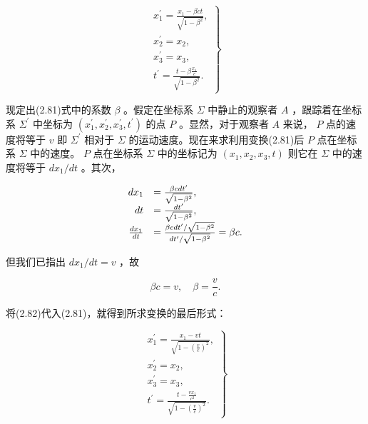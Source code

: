 \begin{equation*}
\left. \begin{array}{l} x _ {1} ^ {\prime} = \frac {x _ {1} - \beta c t}{\sqrt {1 - \beta^ {2}}}, \\ x _ {2} ^ {\prime} = x _ {2}, \\ x _ {3} ^ {\prime} = x _ {3}, \\ t ^ {\prime} = \frac {t - \beta \frac {x _ {1}}{c}}{\sqrt {1 - \beta^ {2}}}. \end{array} \right\}\tag{2.81}
\end{equation*}

现定出(2.81)式中的系数 $\beta$ 。假定在坐标系 $\Sigma$ 中静止的观察者 $A$ ，跟踪着在坐标系 $\Sigma^{\prime}$ 中坐标为 $(x_{1}^{\prime}, x_{2}^{\prime}, x_{3}^{\prime}, t^{\prime})$ 的点 $P$ 。显然，对于观察者 $A$ 来说， $P$ 点的速度将等于 $v$ 即 $\Sigma^{\prime}$ 相对于 $\Sigma$ 的运动速度。现在来求利用变换(2.81)后 $P$ 点在坐标系 $\Sigma$ 中的速度。 $P$ 点在坐标系 $\Sigma$ 中的坐标记为 $(x_{1}, x_{2}, x_{3}, t)$ 则它在 $\Sigma$ 中的速度将等于 $dx_{1}/dt$ 。其次，

\begin{equation*}
\begin{array}{r l} d x _ {1} & = \frac {\beta c d t ^ {\prime}}{\sqrt {1 - \beta^ {2}}}, \\ d t & = \frac {d t ^ {\prime}}{\sqrt {1 - \beta^ {2}}}, \\ \frac {d x _ {1}}{d t} & = \frac {\beta c d t ^ {\prime} / \sqrt {1 - \beta^ {2}}}{d t ^ {\prime} / \sqrt {1 - \beta^ {2}}} = \beta c. \end{array}
\end{equation*}

但我们已指出 $dx_{1} / dt = v$ ，故

\begin{equation*}
\beta c = v, \quad \beta = \frac {v}{c}.\tag{2.82}
\end{equation*}

将(2.82)代入(2.81)，就得到所求变换的最后形式：

\begin{equation*}
\left. \begin{array}{l} x _ {1} ^ {\prime} = \frac {x _ {1} - v t}{\sqrt {1 - \left(\frac {v}{c}\right) ^ {2}}}, \\ x _ {2} ^ {\prime} = x _ {2}, \\ x _ {3} ^ {\prime} = x _ {3}, \\ t ^ {\prime} = \frac {t - \frac {v x _ {1}}{c ^ {2}}}{\sqrt {1 - \left(\frac {v}{c}\right) ^ {2}}}. \end{array} \right\}\tag{2.83}
\end{equation*}


